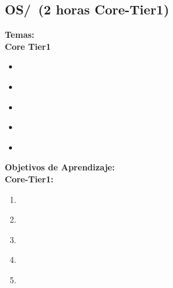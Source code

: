 \subsection{OS/\OSOverviewofOperatingSystems~(2 horas Core-Tier1)}\label{sec:BOK:OSOverviewofOperatingSystems}
\noindent \textbf{Temas:}\\
\noindent \textbf{Core Tier1}
\begin{itemize}
	\item \OSOverviewofOperatingSystemsTopicRole\label{sec:BOK:OSOverviewofOperatingSystemsTopicRole}
	\item \OSOverviewofOperatingSystemsTopicFunctionality\label{sec:BOK:OSOverviewofOperatingSystemsTopicFunctionality}
	\item \OSOverviewofOperatingSystemsTopicMechanisms\label{sec:BOK:OSOverviewofOperatingSystemsTopicMechanisms}
	\item \OSOverviewofOperatingSystemsTopicDesign\label{sec:BOK:OSOverviewofOperatingSystemsTopicDesign}
	\item \OSOverviewofOperatingSystemsTopicInfluences\label{sec:BOK:OSOverviewofOperatingSystemsTopicInfluences}
\end{itemize}


\noindent \textbf{Objetivos de Aprendizaje:}\\
\noindent \textbf{Core-Tier1:}
\begin{enumerate}
	\setcounter{enumi}{0}
	\item \OSOverviewofOperatingSystemsLOExplainTheFunctions\xspace[\OSOverviewofOperatingSystemsLOExplainTheFunctionsLevel]\label{sec:BOK:OSOverviewofOperatingSystemsLOExplainTheFunctions}
	\item \OSOverviewofOperatingSystemsLOAnalyzeTheIn\xspace[\OSOverviewofOperatingSystemsLOAnalyzeTheInLevel]\label{sec:BOK:OSOverviewofOperatingSystemsLOAnalyzeTheIn}
	\item \OSOverviewofOperatingSystemsLODescribeTheASystem\xspace[\OSOverviewofOperatingSystemsLODescribeTheASystemLevel]\label{sec:BOK:OSOverviewofOperatingSystemsLODescribeTheASystem}
	\item \OSOverviewofOperatingSystemsLODiscussNetworked\xspace[\OSOverviewofOperatingSystemsLODiscussNetworkedLevel]\label{sec:BOK:OSOverviewofOperatingSystemsLODiscussNetworked}
	\item \OSOverviewofOperatingSystemsLOIdentifyPotential\xspace[\OSOverviewofOperatingSystemsLOIdentifyPotentialLevel]\label{sec:BOK:OSOverviewofOperatingSystemsLOIdentifyPotential}
\end{enumerate}


